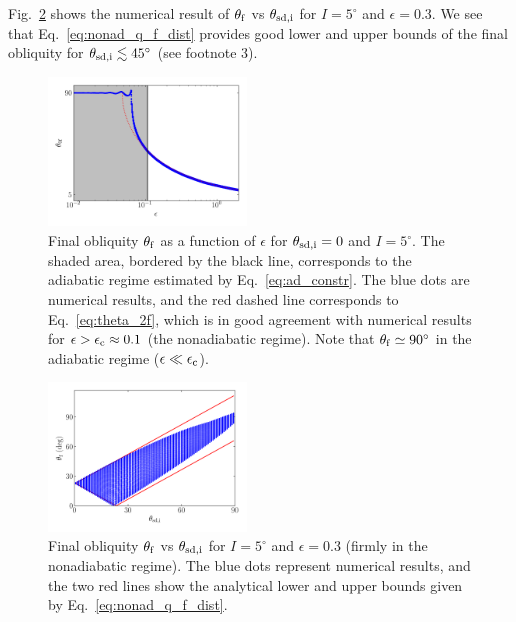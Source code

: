 Fig.~\ref{fig:nonad_3_ensemble} shows the numerical result of $\theta_{\rm f}$
vs $\theta_{\rm sd,i}$ for $I =5^\circ$ and $\epsilon = 0.3$. We see that
Eq.~\eqref{eq:nonad_q_f_dist} provides good lower and upper bounds of the final
obliquity for $\theta_{\rm sd,i} \lesssim 45^\circ$ (see footnote 3).

\begin{figure}
    \centering
    \includegraphics[width=0.47\textwidth]{plots_diskdisp/3scan.png}
    \caption{Final obliquity $\theta_{\rm  f}$ as a function of $\epsilon$ for
    $\theta_{\rm sd,i} = 0$ and $I = 5^\circ$. The shaded area, bordered by the
    black line, corresponds to the adiabatic regime estimated by
    Eq.~\eqref{eq:ad_constr}. The blue dots are numerical results, and the red
    dashed line corresponds to Eq.~\eqref{eq:theta_2f}, which is in good
    agreement with numerical results for $\epsilon > \epsilon_{\rm c} \approx
    0.1$ (the nonadiabatic regime). Note that $\theta_{\rm f} \simeq 90^\circ$
    in the adiabatic regime ($\epsilon\ll \epsilon_{\rm
    c}$).}\label{fig:nonad_3_scan}
\end{figure}
\begin{figure}
    \centering
    \includegraphics[width=0.47\textwidth]{plots_diskdisp/3_ensemble_05_05.png}
    \caption{Final obliquity $\theta_{\rm  f}$ vs $\theta_{\rm sd, i}$ for
    $I=5^\circ$ and $\epsilon = 0.3$ (firmly in the nonadiabatic regime). The
    blue dots represent numerical results, and the two red lines show the
    analytical lower and upper bounds given by
    Eq.~\eqref{eq:nonad_q_f_dist}.}\label{fig:nonad_3_ensemble}
\end{figure}
